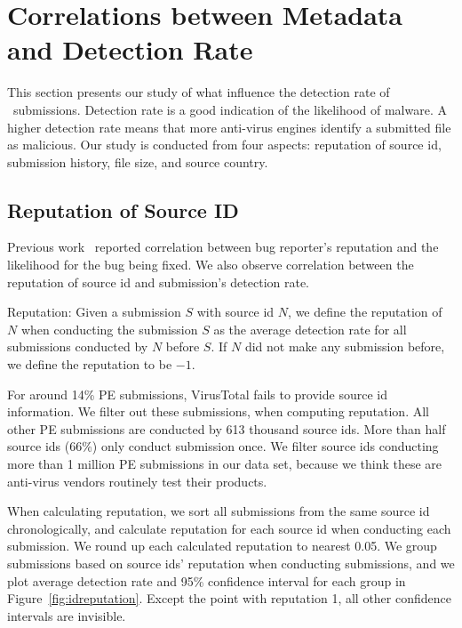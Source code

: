 \section{Correlations between Metadata and Detection Rate}
\label{sec:corr}
This section presents our study of what influence the detection rate of \pe\ submissions.
Detection rate is a good indication of the likelihood of malware.
A higher detection rate means that more anti-virus engines identify a submitted file as malicious.
Our study is conducted from four aspects: reputation of source id, submission history, 
file size, and source country.



\subsection{Reputation of Source ID}

\label{sec:reputation}

Previous work~\cite{GuoICSE2010} reported correlation between bug reporter’s reputation and the likelihood for the bug being fixed. 
We also observe correlation between the reputation of source id and submission’s detection rate. 

\begin{definition}{Reputation:}
Given a submission $S$ with source id $N$, 
we define the reputation of $N$ when conducting the submission $S$ as the average detection rate for all submissions conducted by $N$ before $S$. 
If $N$ did not make any submission before, we define the reputation to be $-1$. 
\end{definition}

For around 14\% PE submissions, VirusTotal fails to provide source id information. 
We filter out these submissions, when computing reputation.
All other PE submissions are conducted by 613 thousand source ids. 
More than half source ids (66\%) only conduct submission once. 
We filter source ids conducting more than 1 million PE submissions in our data set, 
because we think these are anti-virus vendors routinely test their products. 

When calculating reputation, we sort all submissions from the same source id chronologically, 
and calculate reputation for each source id when conducting each submission. 
We round up each calculated reputation to nearest 0.05. 
We group submissions based on source ids' reputation when conducting submissions, 
and we plot average detection rate and 95\% confidence interval for each group in Figure~\ref{fig:idreputation}. 
Except the point with reputation 1, all other confidence intervals are invisible.  

